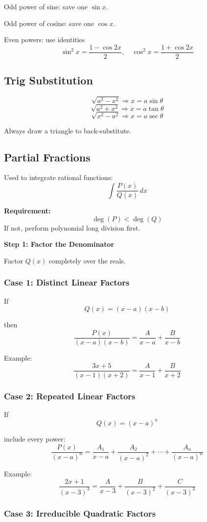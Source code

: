 \documentclass[11pt]{article}
\theoremstyle{mydef}
\begin{document}
Odd power of sine:
save one $\sin x$.

Odd power of cosine:
save one $\cos x$.

Even powers:
use identities
\[
\sin^2x=\frac{1-\cos2x}{2},\quad
\cos^2x=\frac{1+\cos2x}{2}
\]

\subsection*{Trig Substitution}

\[
\sqrt{a^2-x^2}\Rightarrow x=a\sin\theta
\]
\[
\sqrt{a^2+x^2}\Rightarrow x=a\tan\theta
\]
\[
\sqrt{x^2-a^2}\Rightarrow x=a\sec\theta
\]

Always draw a triangle to back-substitute.


\subsection*{Partial Fractions}

Used to integrate rational functions:
\[
\int \frac{P(x)}{Q(x)}\,dx
\]

\textbf{Requirement:}
\[
\deg(P)<\deg(Q)
\]
If not, perform polynomial long division first.

\bigskip
\textbf{Step 1: Factor the Denominator}

Factor $Q(x)$ completely over the reals.

\subsubsection*{Case 1: Distinct Linear Factors}

If
\[
Q(x)=(x-a)(x-b)
\]

then
\[
\frac{P(x)}{(x-a)(x-b)}
=\frac{A}{x-a}+\frac{B}{x-b}
\]

Example:
\[
\frac{3x+5}{(x-1)(x+2)}
=\frac{A}{x-1}+\frac{B}{x+2}
\]

\subsubsection*{Case 2: Repeated Linear Factors}

If
\[
Q(x)=(x-a)^n
\]

include every power:
\[
\frac{P(x)}{(x-a)^n}
=\frac{A_1}{x-a}
+\frac{A_2}{(x-a)^2}
+\cdots
+\frac{A_n}{(x-a)^n}
\]

Example:
\[
\frac{2x+1}{(x-3)^3}
=
\frac{A}{x-3}
+\frac{B}{(x-3)^2}
+\frac{C}{(x-3)^3}
\]

\subsubsection*{Case 3: Irreducible Quadratic Factors}
\end{document}
